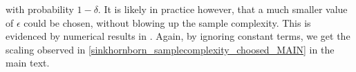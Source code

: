 with probability $1-\delta$. It is likely in practice however, that a much smaller value of $\epsilon$ could be chosen, without blowing up the sample complexity. This is evidenced by numerical results in . Again, by ignoring constant terms, we get the scaling observed in \eqref{sinkhornborn_samplecomplexity_choosed_MAIN} in the main text.

